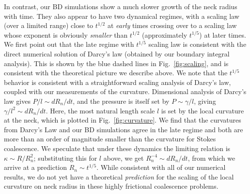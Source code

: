 \documentclass[%
reprint,
amsmath,amssymb,
aps,
]{revtex4-2}
\begin{document}
	In contrast, our BD simulations show a much slower growth of the neck radius with time. They also appear to have two dynamical regimes, with a scaling law (over a limited range) close to $t^{1/2}$ at \emph{early} times crossing over to a scaling law whose exponent is obviously \emph{smaller} than $t^{1/2}$ (approximately $t^{1/5}$) at later times. We first point out that the late regime with $t^{1/5}$ scaling law is consistent with the direct numerical solution of Darcy's law (obtained by our boundary integral analysis). This is shown by the blue dashed lines in Fig.~\ref{fig:scaling}, and is consistent with the theoretical picture we describe above. We note that the $t^{1/5}$ behavior is consistent with a straightforward scaling analysis of Darcy's law, coupled with our measurements of the curvature. Dimensional analysis of Darcy's law gives $P/l\sim dR_n/dt$, and the pressure is itself set by $P\sim\gamma/l$, giving $\gamma/l^2\sim dR_n/dt$. Here, the most natural length scale $l$ is set by the local curvature at the neck, which is plotted in Fig.~\ref{fig:curvature}. We find that the curvatures from Darcy's Law and our BD simulations agree in the late regime and both are more than an order of magnitude smaller than the curvature for Stokes coalescence. We speculate that under these dynamics the limiting relation is $\kappa \sim R/R^2_n$; substituting this for $l$ above, we get $R_n^{-4} \sim dR_n/dt$, from which we arrive at a prediction $R_n\sim t^{1/5}$. While consistent with all of our numerical results, we do not yet have a  theoretical \emph{prediction}  for the scaling of the local curvature on neck radius in these highly  frictional coalescence problems.
 
\end{document}
